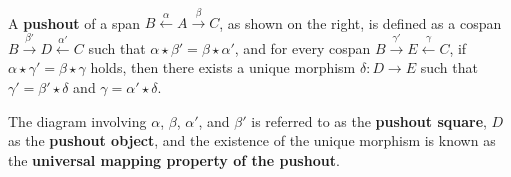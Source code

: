 \begin{definition}
    \label{def:cat:po}
    \ \newline
\noindent
\begin{minipage}{0.7\textwidth}  
    A \textbf{pushout} of a span \( B \overset{\alpha}{\leftarrow} A \overset{\beta}{\rightarrow} C \), as shown on the right, is defined as a cospan \( B \overset{\beta'}{\rightarrow} D \overset{\alpha'}{\leftarrow} C \) such that \( \alpha \star \beta' = \beta \star \alpha' \), and for every cospan \( B \overset{\gamma'}{\rightarrow} E \overset{\gamma}{\leftarrow} C \), if \( \alpha \star \gamma' = \beta \star \gamma \) holds, then there exists a unique morphism \(\delta : D \to E\) such that \( \gamma' = \beta' \star \delta \) and \( \gamma = \alpha' \star \delta \).
\end{minipage}
\hfill
\begin{minipage}{0.299\textwidth}
    \hfill
{}
\end{minipage}
The diagram involving \(\alpha\), \(\beta\), \(\alpha'\), and \(\beta'\) is referred to as the \textbf{pushout square}, \(D\) as the \textbf{pushout object}, and the existence of the unique morphism is known as the \textbf{universal mapping property of the pushout}.
\end{definition} 
